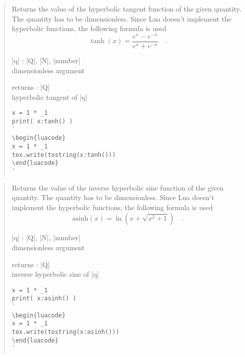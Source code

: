 \documentclass{ltxdoc}
\begin{document}
\begin{quote}
  Returns the value of the hyperbolic tangent function of the given quantity. The quantity has to be dimensionless. Since Lua doesn't implement the hyperbolic functions, the following formula is used 
  $$
    \tanh(x) = \frac{e^x - e^{-x}}{e^x + e^{-x}} \quad.
  $$

  \begin{description}
  \item |q| : |Q|, |N|, |number|\\
    dimensionless argument

  \item returns : |Q|\\
    hyperbolic tangent of |q|
  \end{description}

\begin{lstlisting}
x = 1 * _1
print( x:tanh() )
`
\begin{luacode}
x = 1 * _1
tex.write(tostring(x:tanh()))
\end{luacode}
`
\end{lstlisting}

\end{quote}




\begin{quote}
  Returns the value of the inverse hyperbolic sine function of the given quantity. The quantity has to be dimensionless. Since Lua doesn't implement the hyperbolic functions, the following formula is used 
  $$
    \text{asinh}(x) = \ln\left( x + \sqrt{x^2 + 1} \right)  \quad.
  $$

  \begin{description}
  \item |q| : |Q|, |N|, |number|\\
    dimensionless argument

  \item returns : |Q|\\
    inverse hyperbolic sine of |q|
  \end{description}


\begin{lstlisting}
x = 1 * _1
print( x:asinh() )
`
\begin{luacode}
x = 1 * _1
tex.write(tostring(x:asinh()))
\end{luacode}
`
\end{lstlisting}

\end{quote}
\end{document}
